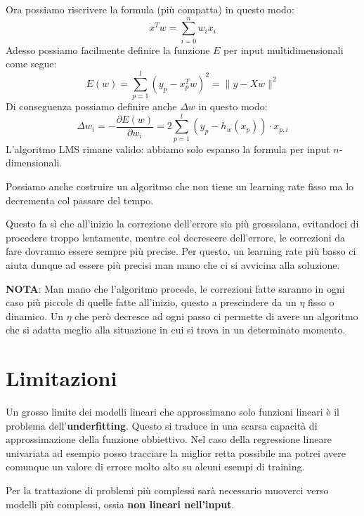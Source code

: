 Ora possiamo riscrivere la formula (pi\`u compatta) in questo modo:
\[ x^T w = \sum_{i=0}^n w_i x_i \]
Adesso possiamo facilmente definire la funzione $E$ per input multidimensionali come segue:
\[ E(w) = \sum_{p=1}^l (y_p - x^T_p w)^2 = \| y - X w \|^2 \]
Di conseguenza possiamo definire anche $\Delta w$ in questo modo:
\[ \Delta w_i = -\frac{\partial E(w)}{\partial w_i} = 2 \sum_{p=1}^l (y_p - h_w(x_p)) \cdot x_{p, i} \]
L'algoritmo LMS rimane valido: abbiamo solo espanso la formula per input $n$-dimensionali.

Possiamo anche costruire un algoritmo che non tiene un learning rate fisso ma lo decrementa col passare del tempo.

Questo fa s\`i che all'inizio la correzione dell'errore sia pi\`u grossolana, evitandoci di procedere troppo lentamente,
mentre col decrescere dell'errore, le correzioni da fare dovranno essere sempre pi\`u precise. Per questo, un learning
rate pi\`u basso ci aiuta dunque ad essere pi\`u precisi man mano che ci si avvicina alla soluzione.

\textbf{NOTA}: Man mano che l'algoritmo procede, le correzioni fatte saranno in ogni caso pi\`u piccole di quelle fatte
all'inizio, questo a prescindere da un $\eta$ fisso o dinamico. Un $\eta$ che per\`o decresce ad ogni passo ci permette di
avere un algoritmo che si adatta meglio alla situazione in cui si trova in un determinato momento.

\section{Limitazioni}
Un grosso limite dei modelli lineari che approssimano solo funzioni lineari \`e il problema dell'\textbf{underfitting}.
Questo si traduce in una scarsa capacit\`a di approssimazione della funzione obbiettivo. Nel caso della regressione
lineare univariata ad esempio posso tracciare la miglior retta possibile ma potrei avere comunque un valore di errore
molto alto su alcuni esempi di training.

Per la trattazione di problemi pi\`u complessi sar\`a necessario muoverci verso modelli pi\`u complessi, ossia
\textbf{non lineari nell'input}.